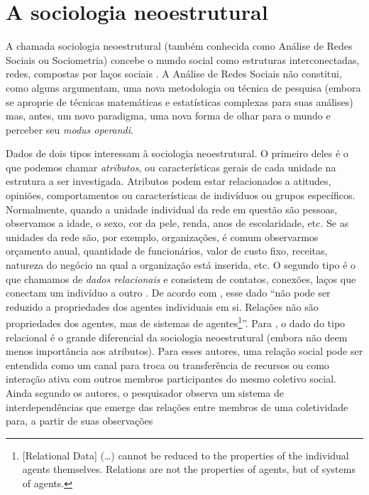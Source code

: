 \documentclass[a4paper, 12pt, openright, oneside, german, french, english, brazil]{abntex2}
\begin{document}

	
	\chapter{A sociologia neoestrutural}
	
	A chamada sociologia neoestrutural (também conhecida como Análise de Redes Sociais ou Sociometria) concebe o mundo social como estruturas interconectadas, redes, compostas por laços sociais \cite{denooy2011exploratory}. A Análise de Redes Sociais não constitui, como alguns argumentam, uma nova metodologia ou técnica de pesquisa (embora se aproprie de técnicas matemáticas e estatísticas complexas para suas análises) mas, antes, um novo paradigma, uma nova forma de olhar para o mundo e perceber seu \textit{modus operandi}.
	
	Dados de dois tipos interessam à sociologia neoestrutural. O primeiro deles é o que podemos chamar \textit{atributos}, ou características gerais de cada unidade na estrutura a ser investigada. Atributos podem estar relacionados a atitudes, opiniões, comportamentos ou características de indivíduos ou grupos específicos. Normalmente, quando a unidade individual da rede em questão são pessoas, observamos a idade, o sexo, cor da pele, renda, anos de escolaridade, etc. Se as unidades da rede são, por exemplo, organizações, é comum observarmos orçamento anual, quantidade de funcionários, valor de custo fixo, receitas, natureza do negócio na qual a organização está inserida, etc. O segundo tipo é o que chamamos de \textit{dados relacionais} e consistem de contatos, conexões, laços que conectam um indivíduo a outro \cite{scott2017social,wasserman1994social,lazega2014redes}. De acordo com , esse dado ``não pode ser reduzido a propriedades dos agentes individuais em si. Relações não são propriedades dos agentes, mas de sistemas de agentes\footnote{[Relational Data] (\dots) cannot be reduced to the properties of the individual agents themselves. Relations are not the properties of agents, but of systems of agents.}''. Para , o dado do tipo relacional é o grande diferencial da sociologia neoestrutural (embora não deem menos importância aos atributos). Para esses autores, uma relação social pode ser entendida como um canal para troca ou transferência de recursos ou como interação ativa com outros membros participantes do mesmo coletivo social. Ainda segundo os autores, o pesquisador observa um sistema de interdependências que emerge das relações entre membros de uma coletividade para, a partir de suas observações
	
\end{document}
